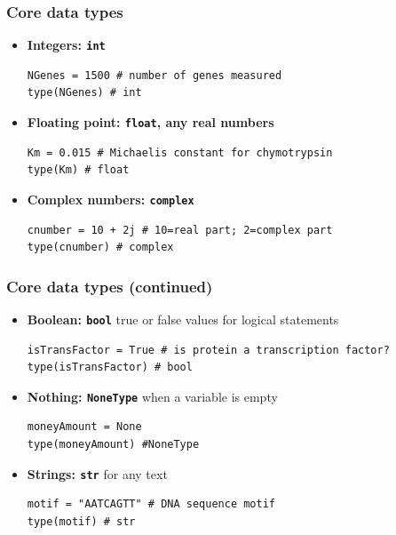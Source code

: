 \documentclass[xcolor=table]{beamer}
\begin{document}
\begin{frame}[fragile]
\frametitle{Core data types}

\begin{itemize}\addtolength{\itemsep}{0.5\baselineskip}

\item<1-> \textbf{Integers: \texttt{int}}\\
\begin{lstlisting}[style=python]
NGenes = 1500 # number of genes measured
type(NGenes) # int
\end{lstlisting}
	
\item<2-> \textbf{Floating point: \texttt{float}, any real numbers}
\begin{lstlisting}[style=python]
Km = 0.015 # Michaelis constant for chymotrypsin
type(Km) # float
\end{lstlisting}
	
\item<3-> \textbf{Complex numbers: \texttt{complex}}
\begin{lstlisting}[style=python]
cnumber = 10 + 2j # 10=real part; 2=complex part
type(cnumber) # complex
\end{lstlisting}

\end{itemize}

\end{frame}

\begin{frame}[fragile]
    \frametitle{Core data types (continued)}

\begin{itemize}\addtolength{\itemsep}{0.5\baselineskip}

\item<1-> \textbf{Boolean: \texttt{bool} } true or false values for logical statements
\begin{lstlisting}[style=python]
isTransFactor = True # is protein a transcription factor?
type(isTransFactor) # bool
\end{lstlisting}

\item<2-> \textbf{Nothing: \texttt{NoneType} } when a variable is empty
\begin{lstlisting}[style=python]
moneyAmount = None
type(moneyAmount) #NoneType
\end{lstlisting}
 
\item<3-> \textbf{Strings: \texttt{str}} for any text
\begin{lstlisting}[style=python]
motif = "AATCAGTT" # DNA sequence motif
type(motif) # str
\end{lstlisting}
\end{itemize}
\end{frame}
\end{document}
